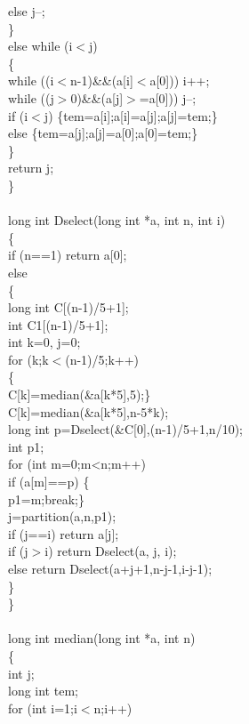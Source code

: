 \documentclass{article}
\begin{document}
        else j--;\\
    \}\\
    else while (i$<$j)\\
        \{\\
            while ((i$<$n-1)\&\&(a[i]$<$a[0])) i++;\\
            while ((j$>$0)\&\&(a[j]$>$=a[0])) j--;\\
            if (i$<$j) \{tem=a[i];a[i]=a[j];a[j]=tem;\}\\
            else \{tem=a[j];a[j]=a[0];a[0]=tem;\}\\
        \}\\
    return j;\\
\}\\
\\
long int Dselect(long int *a, int n, int i)\\
\{\\
    if (n==1) return a[0];\\
    else\\
    \{\\
        long int C[(n-1)/5+1];\\
	    int C1[(n-1)/5+1];\\
        int k=0, j=0;\\
        for (k;k$<$(n-1)/5;k++)\\
            \{\\C[k]=median(\&a[k*5],5);\}\\
        C[k]=median(\&a[k*5],n-5*k);\\
        long int p=Dselect(\&C[0],(n-1)/5+1,n/10);\\
	int p1;\\
	for (int m=0;m<n;m++)\\
	if (a[m]==p) \{\\p1=m;break;\}\\
        j=partition(a,n,p1);\\
        if (j==i) return a[j];\\
        if (j$>$i) return Dselect(a, j, i);\\
        else return Dselect(a+j+1,n-j-1,i-j-1);\\
    \}\\
\}\\
\\
long int median(long int *a, int n)\\
\{\\
    int j;\\
    long int tem;\\
    for (int i=1;i$<$n;i++)\\
\end{document}
